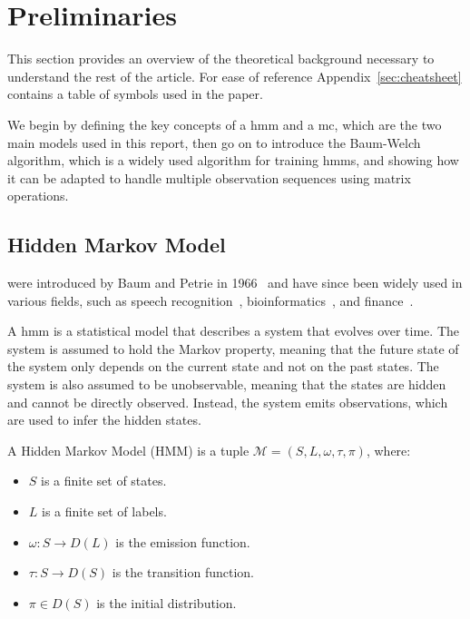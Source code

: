 \section{Preliminaries}\label{sec:preliminaries}
This section provides an overview of the theoretical background necessary to understand the rest of the article.
For ease of reference Appendix~\ref{sec:cheatsheet} contains a table of symbols used in the paper.

We begin by defining the key concepts of a \gls{hmm} and a \gls{mc}, which are the two main models used in this report, then go on to introduce the Baum-Welch algorithm, which is a widely used algorithm for training \glspl{hmm}, and showing how it can be adapted to handle multiple observation sequences using matrix operations.

\subsection{Hidden Markov Model}\label{subsec:hmm}
 were introduced by Baum and Petrie in 1966~\cite{baum1966statistical} and have since been widely used in various fields, such as speech recognition~\cite{chavan2013overview}, bioinformatics~\cite{ciocchetta2009bio}, and finance~\cite{mamon2007hidden}.

A \gls{hmm} is a statistical model that describes a system that evolves over time.
The system is assumed to hold the Markov property, meaning that the future state of the system only depends on the current state and not on the past states.
The system is also assumed to be unobservable, meaning that the states are hidden and cannot be directly observed.
Instead, the system emits observations, which are used to infer the hidden states.


\begin{definition}
    A Hidden Markov Model (HMM) is a tuple $\mathcal{M} = (S, L, \omega, \tau, \pi)$, where:
    \begin{itemize}
        \item $S$ is a finite set of states.
        \item $L$ is a finite set of labels.
        \item $\omega: S \rightarrow D(L)$ is the emission function.
        \item $\tau: S \rightarrow D(S)$ is the transition function.
        \item $\pi \in D(S)$ is the initial distribution.
    \end{itemize}
\end{definition}


